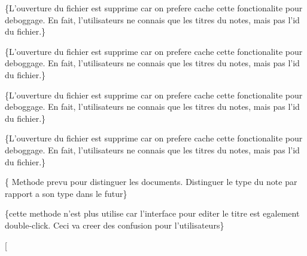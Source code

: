 
\begin{DoxyRefList}
\item[\label{deprecated__deprecated000001}%
\hypertarget{deprecated__deprecated000001}{}%
Member \hyperlink{class_article_factory_a7c286cb7fe60c9c91456ae65d6b80cf8}{Article\-Factory\-:\-:get\-Extension} ()]\{L'ouverture du fichier est supprime car on prefere cache cette fonctionalite pour deboggage. En fait, l'utilisateurs ne connais que les titres du notes, mais pas l'id du fichier.\}  
\item[\label{deprecated__deprecated000002}%
\hypertarget{deprecated__deprecated000002}{}%
Member \hyperlink{class_audio_note_factory_ad8d31f7a05a62979ff24b5bfa97ad686}{Audio\-Note\-Factory\-:\-:get\-Extension} ()]\{L'ouverture du fichier est supprime car on prefere cache cette fonctionalite pour deboggage. En fait, l'utilisateurs ne connais que les titres du notes, mais pas l'id du fichier.\}  
\item[\label{deprecated__deprecated000003}%
\hypertarget{deprecated__deprecated000003}{}%
Member \hyperlink{class_document_factory_a34912629970356c2c8737abeac2d30d4}{Document\-Factory\-:\-:get\-Extension} ()]\{L'ouverture du fichier est supprime car on prefere cache cette fonctionalite pour deboggage. En fait, l'utilisateurs ne connais que les titres du notes, mais pas l'id du fichier.\}  
\item[\label{deprecated__deprecated000004}%
\hypertarget{deprecated__deprecated000004}{}%
Member \hyperlink{class_image_note_factory_a69ec7ba140422d90c5ff7eaacc950714}{Image\-Note\-Factory\-:\-:get\-Extension} ()]\{L'ouverture du fichier est supprime car on prefere cache cette fonctionalite pour deboggage. En fait, l'utilisateurs ne connais que les titres du notes, mais pas l'id du fichier.\}  
\item[\label{deprecated__deprecated000005}%
\hypertarget{deprecated__deprecated000005}{}%
Member \hyperlink{class_note_a543b160dbe2bcb3c746cb9679ad1eb64}{Note\-:\-:is\-Document} () const ]\{ Methode prevu pour distinguer les documents. Distinguer le type du note par rapport a son type dans le futur\}  
\item[\label{deprecated__deprecated000006}%
\hypertarget{deprecated__deprecated000006}{}%
Member \hyperlink{class_tree_item_ade9049b23b5ebe1bbede8f404e17f515}{Tree\-Item\-:\-:update\-Underlying\-Note\-Title} (const Q\-Variant \&)]\{cette methode n'est plus utilise car l'interface pour editer le titre est egalement double-\/click. Ceci va creer des confusion pour l'utilisateurs\}  
\item[\label{deprecated__deprecated000008}%

\end{DoxyRefList}
